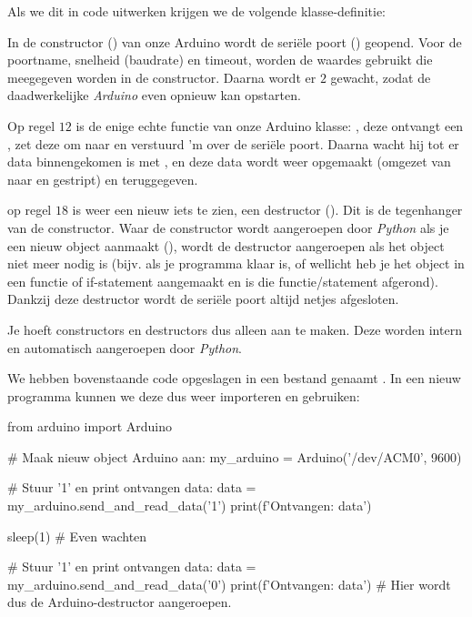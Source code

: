 Als we dit in code uitwerken krijgen we de volgende klasse-definitie:

In de constructor () van onze Arduino wordt de seriële poort () geopend. Voor de poortname, snelheid (baudrate) en timeout, worden de waardes gebruikt die meegegeven worden in de constructor. Daarna wordt er $2$ gewacht, zodat de daadwerkelijke \textit{Arduino} even opnieuw kan opstarten. \newline

Op regel $12$ is de enige echte functie van onze Arduino klasse: , deze ontvangt een , zet deze om naar  en verstuurd 'm over de seriële poort. Daarna wacht hij tot er data binnengekomen is met , en deze data wordt weer opgemaakt (omgezet van  naar  en gestript) en teruggegeven. \newline

op regel $18$ is weer een nieuw iets te zien, een destructor (). Dit is de tegenhanger van de constructor. Waar de constructor wordt aangeroepen door \textit{Python} als je een nieuw object aanmaakt (), wordt de destructor aangeroepen als het object niet meer nodig is (bijv. als je programma klaar is, of wellicht heb je het object in een functie of if-statement aangemaakt en is die functie/statement afgerond). Dankzij deze destructor wordt de seriële poort altijd netjes afgesloten.
\begin{remark}
Je hoeft constructors en destructors dus alleen aan te maken. Deze worden intern en automatisch aangeroepen door \textit{Python}. 
\end{remark}

We hebben bovenstaande code opgeslagen in een bestand genaamt . In een nieuw programma kunnen we deze dus weer importeren en gebruiken:
\begin{python}
from arduino import Arduino

# Maak nieuw object Arduino aan:
my_arduino = Arduino('/dev/ACM0', 9600)

# Stuur '1' en print ontvangen data:
data = my_arduino.send_and_read_data('1')
print(f'Ontvangen: {data}')

sleep(1)  # Even wachten

# Stuur '1' en print ontvangen data:
data = my_arduino.send_and_read_data('0')
print(f'Ontvangen: {data}')
# Hier wordt dus de Arduino-destructor aangeroepen.
\end{python}

